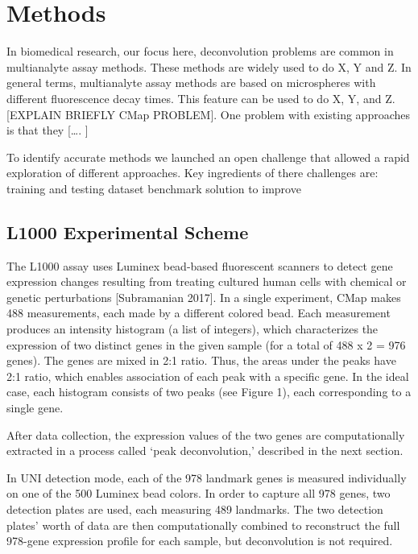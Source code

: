 \documentclass[]{article}
\begin{document}
\hypertarget{methods-1}{%
\section{Methods}\label{methods-1}}

In biomedical research, our focus here, deconvolution problems are
common in multianalyte assay methods. These methods are widely used to
do X, Y and Z. In general terms, multianalyte assay methods are based on
microspheres with different fluorescence decay times. This feature can
be used to do X, Y, and Z. {[}EXPLAIN BRIEFLY CMap PROBLEM{]}. One
problem with existing approaches is that they {[}\ldots{}. {]}

To identify accurate methods we launched an open challenge that allowed
a rapid exploration of different approaches. Key ingredients of there
challenges are: training and testing dataset benchmark solution to
improve

\hypertarget{l1000-experimental-scheme-1}{%
\subsection{L1000 Experimental
Scheme}\label{l1000-experimental-scheme-1}}

The L1000 assay uses Luminex bead-based fluorescent scanners to detect
gene expression changes resulting from treating cultured human cells
with chemical or genetic perturbations {[}Subramanian 2017{]}. In a
single experiment, CMap makes 488 measurements, each made by a different
colored bead. Each measurement produces an intensity histogram (a list
of integers), which characterizes the expression of two distinct genes
in the given sample (for a total of 488 x 2 = 976 genes). The genes are
mixed in 2:1 ratio. Thus, the areas under the peaks have 2:1 ratio,
which enables association of each peak with a specific gene. In the
ideal case, each histogram consists of two peaks (see Figure 1), each
corresponding to a single gene.

After data collection, the expression values of the two genes are
computationally extracted in a process called `peak deconvolution,'
described in the next section.

In UNI detection mode, each of the 978 landmark genes is measured
individually on one of the 500 Luminex bead colors. In order to capture
all 978 genes, two detection plates are used, each measuring 489
landmarks. The two detection plates' worth of data are then
computationally combined to reconstruct the full 978-gene expression
profile for each sample, but deconvolution is not required.
\end{document}
